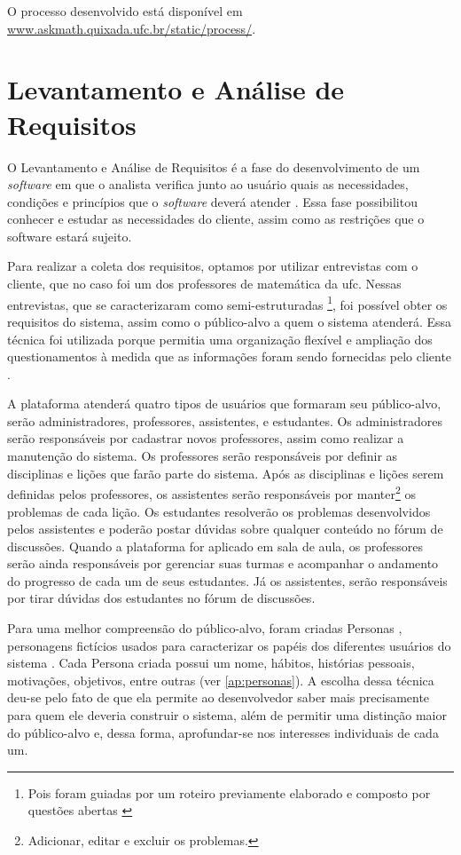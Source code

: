 O processo desenvolvido est\'a dispon\'ivel em \url{www.askmath.quixada.ufc.br/static/process/}. 

\section{Levantamento e Análise de Requisitos}


O Levantamento e An\'alise de Requisitos é a fase do desenvolvimento de um \textit{software} em que o analista verifica junto ao usuário 
quais as necessidades, condições e princípios que o \textit{software} deverá atender \cite{matuda2013mapas}. Essa fase possibilitou 
conhecer e estudar as necessidades do cliente, assim como as restrições que o software estará sujeito.

Para realizar a coleta dos requisitos, optamos por utilizar entrevistas com o cliente, que no caso foi um dos professores de matemática da \gls{ufc}. Nessas entrevistas, que se caracterizaram como semi-estruturadas \footnote{Pois foram guiadas por um 
roteiro previamente elaborado e composto por questões abertas \cite{belei2008uso}}, foi possível obter os requisitos do sistema, assim como 
o público-alvo a quem o sistema atenderá. Essa técnica foi utilizada porque permitia uma organização flexível e ampliação dos 
questionamentos à medida que as informações foram sendo fornecidas pelo cliente \cite{fujisawa2000utilizaccao}.

A plataforma atender\'a quatro tipos de usu\'arios que formaram seu p\'ublico-alvo, ser\~ao administradores, professores, assistentes, e estudantes. Os administradores ser\~ao respons\'aveis por 
cadastrar novos professores, assim como realizar a manuten\c{c}\~ao do sistema. Os professores ser\~ao responsáveis por definir 
as disciplinas e li\c{c}\~oes que far\~ao parte do sistema. 
Ap\'os as disciplinas e li\c{c}\~oes serem definidas pelos professores, os assistentes ser\~ao respons\'aveis por manter\footnote{Adicionar, editar e excluir os problemas.} os problemas de cada 
li\c{c}\~ao. Os estudantes resolver\~ao os problemas desenvolvidos pelos assistentes e poder\~ao postar d\'uvidas sobre qualquer conte\'udo 
no f\'orum de discuss\~oes. Quando a plataforma for aplicado em sala de aula, os professores ser\~ao ainda respons\'aveis por gerenciar suas 
turmas e acompanhar o andamento do progresso de cada um de seus estudantes. J\'a os assistentes, ser\~ao responsáveis por tirar d\'uvidas 
dos estudantes no f\'orum de discuss\~oes.

Para uma melhor compreensão do público-alvo, foram criadas Personas \cite{pruitt2003personas}, personagens fictícios usados para 
caracterizar os papéis dos diferentes usuários do sistema \cite{guerra2010colaboraccao}. Cada Persona criada possui um nome, hábitos, 
histórias pessoais, motivações, objetivos, entre outras (ver \autoref{ap:personas}). A escolha dessa técnica deu-se pelo fato de que ela 
permite ao desenvolvedor saber mais precisamente para 
quem ele deveria construir o sistema, além de permitir uma distinção maior do público-alvo e, dessa forma, aprofundar-se nos interesses individuais de cada um.

